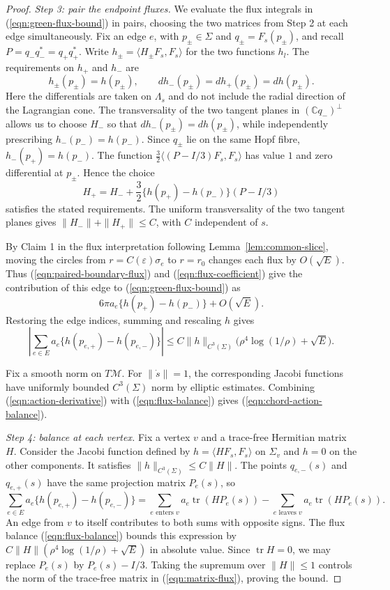 \documentclass[11pt,a4paper]{article}
\numberwithin{equation}{section}
\theoremstyle{definition}
\theoremstyle{remark}
\begin{document}
\begin{proof}
		\smallskip
		\noindent\emph{Step 3: pair the endpoint fluxes.}
		We evaluate the flux integrals in (\ref{eqn:green-flux-bound}) in pairs,
		choosing the two matrices from Step 2 at each edge simultaneously.
		Fix an edge $e$, with $p_\pm\in\Sigma$ and $q_\pm=F_s(p_\pm)$, and recall
		$P=q_-q_-^*=q_+q_+^*$.
		Write $h_\pm=\langle H_\pm F_s,F_s\rangle$ for the two functions $h_l$.
		The requirements on $h_+$ and $h_-$ are
		\[
		h_\pm(p_\pm)=h(p_\pm),\qquad
		dh_-(p_\pm)=dh_+(p_\pm)=dh(p_\pm).
		\]
		Here the differentials are taken on $\Lambda_s$ and do not include
		the radial direction of the Lagrangian cone.
		The transversality of the two tangent planes in $(\mathbb C q_-)^\perp$
		allows us to choose $H_-$ so that $dh_-(p_\pm)=dh(p_\pm)$,
		while independently prescribing $h_-(p_-)=h(p_-)$.
		Since $q_\pm$ lie on the same Hopf fibre,
		$h_-(p_+)=h(p_-)$.
		The function $\frac32\langle(P-I/3)F_s,F_s\rangle$ has value $1$
		and zero differential at $p_\pm$. Hence the choice
		\[
		H_+=H_-+\frac32\{h(p_+)-h(p_-)\}(P-I/3)
		\]
		satisfies the stated requirements.
		The uniform transversality of the two tangent planes gives
		$\|H_-\|+\|H_+\|\le C$, with $C$ independent of $s$.
		
		By Claim 1 in the flux interpretation following
		Lemma~\ref{lem:common-slice}, moving the circles from $r=C(\varepsilon)\sigma_e$
		to $r=r_0$ changes each flux by $O(\sqrt E)$.
		Thus (\ref{eqn:paired-boundary-flux}) and (\ref{eqn:flux-coefficient})
		give the contribution of this edge to
		(\ref{eqn:green-flux-bound}) as
		\[
		6\pi a_e\{h(p_+)-h(p_-)\}+O(\sqrt E).
		\]
		Restoring the edge indices, summing and rescaling $h$ gives
		\begin{equation}\label{eqn:flux-balance}
			\left|\sum_{e\in E}a_e\{h(p_{e,+})-h(p_{e,-})\}\right|
			\le C\|h\|_{C^3(\Sigma)}\bigl(\rho^4\log(1/\rho)+\sqrt E\bigr).
		\end{equation}
		
		Fix a smooth norm on $T\mathcal M$. For $\|\dot s\|=1$, the corresponding
		Jacobi functions have uniformly bounded $C^3(\Sigma)$ norm by elliptic
		estimates. Combining
		(\ref{eqn:action-derivative}) with (\ref{eqn:flux-balance}) gives
		(\ref{eqn:chord-action-balance}).
		
		\smallskip
		\noindent\emph{Step 4: balance at each vertex.}
		Fix a vertex $v$ and a trace-free Hermitian matrix $H$.
		Consider the Jacobi function defined by $h=\langle HF_s,F_s\rangle$ on
		$\Sigma_v$ and $h=0$ on the other components. It satisfies
		$\|h\|_{C^3(\Sigma)}\le C\|H\|$.
		The points $q_{e,-}(s)$ and $q_{e,+}(s)$ have the same projection matrix $P_e(s)$, so
		\[
		\sum_{e\in E}a_e\{h(p_{e,+})-h(p_{e,-})\}
		=\sum_{e\text{ enters }v}a_e\operatorname{tr}(HP_e(s))
		-\sum_{e\text{ leaves }v}a_e\operatorname{tr}(HP_e(s)).
		\]
		An edge from $v$ to itself contributes to both sums with opposite signs.
		The flux balance (\ref{eqn:flux-balance}) bounds this
		expression by $C\|H\|(\rho^4\log(1/\rho)+\sqrt E)$ in absolute value.
		Since $\operatorname{tr}H=0$, we may replace $P_e(s)$ by $P_e(s)-I/3$.
		Taking the supremum over $\|H\|\le1$ controls the norm of the trace-free
		matrix in (\ref{eqn:matrix-flux}), proving the bound.
	\end{proof}
	
\end{document}
